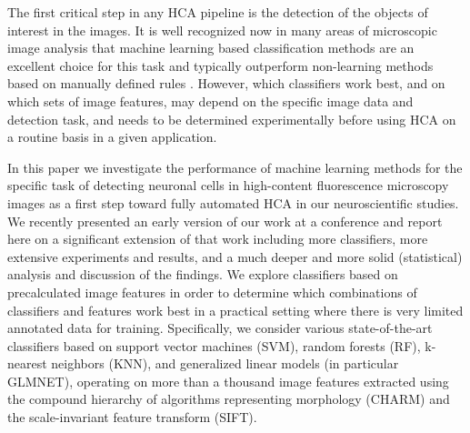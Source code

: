 
The first critical step in any HCA pipeline is the detection of the objects of interest in the images. It is well recognized now in many areas of microscopic image analysis that machine learning based classification methods are an excellent choice for this task and typically outperform non-learning methods based on manually defined rules \citep{Horvath-2011, Sommer-2013, Kraus-2016, Arganda-Carreras-2017}. However, which classifiers work best, and on which sets of image features, may depend on the specific image data and detection task, and needs to be determined experimentally before using HCA on a routine basis in a given application.

In this paper we investigate the performance of machine learning methods for the specific task of detecting neuronal cells in high-content fluorescence microscopy images as a first step toward fully automated HCA in our neuroscientific studies. We recently presented an early version of our work at a conference \citep{Mata-2016} and report here on a significant extension of that work including more classifiers, more extensive experiments and results, and a much deeper and more solid (statistical) analysis and discussion of the findings. {\color{red}We explore classifiers based on precalculated image features in order to determine which combinations of classifiers and features work best in a practical setting where there is very limited annotated data for training. Specifically, we consider various state-of-the-art classifiers based on support vector machines (SVM), random forests (RF), k-nearest neighbors (KNN), and generalized linear models (in particular GLMNET)}, operating on more than a thousand image features extracted using the compound hierarchy of algorithms representing morphology (CHARM) and the scale-invariant feature transform (SIFT).

